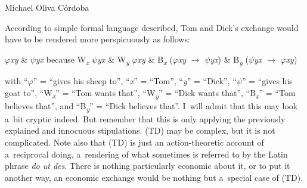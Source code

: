 \begin{artengenv}{Michael Oliva Córdoba}
%
%
%
%

\noindent According to simple formal language described, Tom and Dick's exchange would have to be rendered more perspicuously as follows:
\vspace{-.09cm}
\begin{description}[font=\normalfont, labelindent=0pt, leftmargin=!, labelwidth=1cm]
  \item[(TD)] \textit{$\varphi $xy} \& \textit{$\psi $yx} because W\textit{\textsubscript{x}} \textit{$\psi $yx} \& W\textit{\textsubscript{y}} \textit{$\varphi $xy} \& B\textit{\textsubscript{x}} (\textit{$\varphi $xy} $\to$ \textit{$\psi $yx}) \& B\textit{\textsubscript{y}} (\textit{$\psi $yx} $\to$ \textit{$\varphi $xy})
\end{description}
\vspace{-.09cm}

%
%
%
%

\noindent with ``\textit{$\varphi $}'' = ``gives his sheep to'', ``\textit{x}'' = ``Tom'', ``\textit{y}'' = ``Dick'', ``\textit{$\psi $}'' = ``gives his goat to'', ``W\textit{\textsubscript{x}}'' = ``Tom wants that'', ``W\textit{\textsubscript{y}}'' = ``Dick wants that'', ``B\textit{\textsubscript{x}}'' = ``Tom believes that'', and ``B\textit{\textsubscript{y}}'' = ``Dick believes that''. I~will admit that this may look a~bit cryptic indeed. But remember that this is only applying the previously explained and innocuous stipulations. (TD) may be complex, but it is not complicated. Note also that (TD) is just an action-theoretic account of a~reciprocal doing, a~rendering of what sometimes is referred to by the Latin phrase \textit{do ut des}. There is nothing particularly economic about it, or to put it another way, an economic exchange would be nothing but a~special case of (TD).




\end{artengenv}
